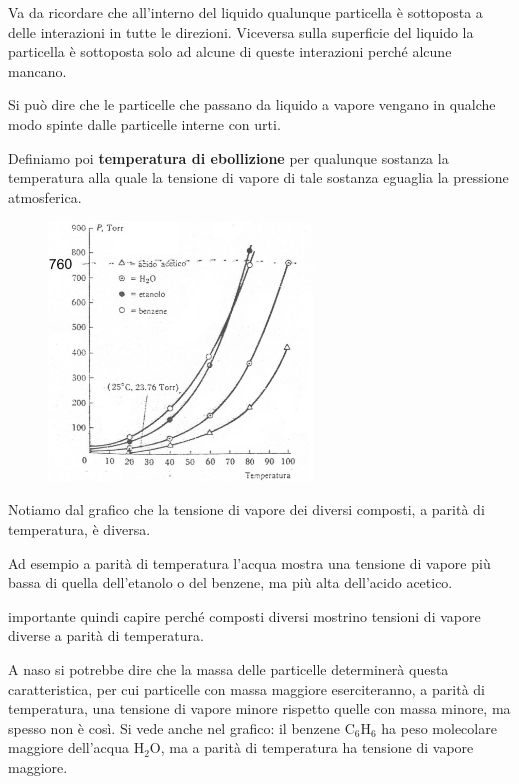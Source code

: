 \vspace{0.3cm}Va da ricordare che all'interno del liquido qualunque particella è sottoposta a delle interazioni in tutte le direzioni. Viceversa sulla superficie del liquido la particella è sottoposta solo ad alcune di queste interazioni perché alcune mancano.

Si può dire che le particelle che passano da liquido a vapore vengano in qualche modo spinte dalle particelle interne con urti.

\vspace{0.2cm}Definiamo poi \textbf{temperatura di ebollizione} per qualunque sostanza la temperatura alla quale la tensione di vapore di tale sostanza eguaglia la pressione atmosferica.

\hspace{0.5cm}\begin{minipage}{0.5 \textwidth}
    \begin{figure}[H]
        \includegraphics[width=7cm]{immagini/tensioni_di_vapore.png}
    \end{figure}
\end{minipage}
\begin{minipage}{0.4 \textwidth}
Notiamo dal grafico che la tensione di vapore dei diversi composti, a parità di temperatura, è diversa.

\vspace{0.2cm}Ad esempio a parità di temperatura l'acqua mostra una tensione di vapore più bassa di quella dell'etanolo o del benzene, ma più alta dell'acido acetico.
\end{minipage}
\E importante quindi capire perché composti diversi mostrino tensioni di vapore diverse a parità di temperatura.

A naso si potrebbe dire che la massa delle particelle determinerà questa caratteristica, per cui particelle con massa maggiore eserciteranno, a parità di temperatura, una tensione di vapore minore rispetto quelle con massa minore, ma spesso non è così. Si vede anche nel grafico: il benzene C$_6$H$_6$ ha peso molecolare maggiore dell'acqua H$_2$O, ma a parità di temperatura ha tensione di vapore maggiore.

